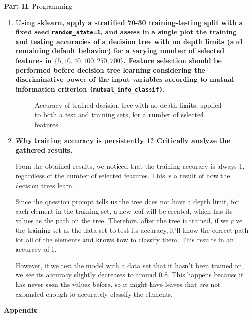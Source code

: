 \documentclass[12pt]{article}
\begin{document}
\center\large{\textbf{Part II}: Programming}

\begin{enumerate}[leftmargin=\labelsep]
    \item {\bfseries Using sklearn, apply a stratified 70-30 training-testing split with a fixed seed
          \texttt{random\_state=1}, and assess in a single plot the training and testing accuracies of
          a decision tree with no depth limits (and remaining default behavior) for a varying number
          of selected features in \(\{5,10,40,100,250,700\}\).
          Feature selection should be performed before decision tree learning considering the
          discriminative power of the input variables according to mutual information criterion
          \texttt{(mutual\_info\_classif)}.
          }

          \begin{figure}[h!]
              \centering
              
              \caption{Accuracy of trained decision tree with no depth limits, applied to both a test and training sets, for a number of selected features.}
              \label{fig:ex1-plot}
          \end{figure}

    \item \textbf{Why training accuracy is persistently 1? Critically analyze the gathered results.}

          From the obtained results, we noticed that the training accuracy is always 1, regardless of the number of selected features.
          This is a result of how the decision trees learn.

          Since the question prompt tells us the tree does not have a depth limit, for each element in the training set, a new leaf will be created, which has its values as the path on the tree.
          Therefore, after the tree is trained, if we give the training set as the data set to test its accuracy, it'll know the correct path for all of the elements and knows how to classify them.
          This results in an accuracy of 1.

          However, if we test the model with a data set that it hasn't been trained on, we see its accuracy slightly decreases to around 0.8.
          This happens because it has never seen the values before, so it might have leaves that are not expanded enough to accurately classify the elements.
\end{enumerate}

\center\large{\textbf{Appendix}\vskip 0.3cm}


\end{document}
